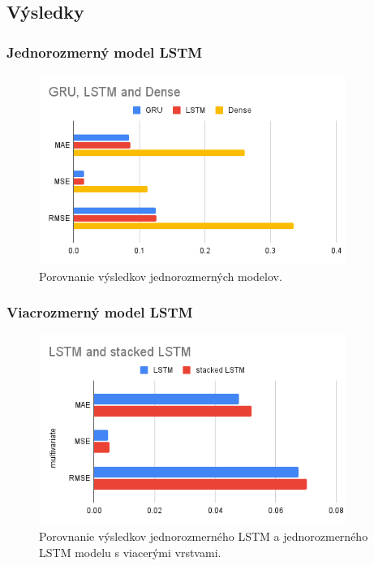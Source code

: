 \subsection{Výsledky}


\subsubsection{Jednorozmerný model LSTM}
\begin{figure}[!htbp]
  \centering
  \includegraphics[width=10cm]{img/GRU, LSTM and Dense.png}
  \caption{Porovnanie výsledkov jednorozmerných modelov.}
  \label{univariate}
\end{figure}


\subsubsection{Viacrozmerný model LSTM}
\begin{figure}[!htbp]
  \centering
  \includegraphics[width=10cm]{img/LSTM and stacked LSTM.png}
  \caption{Porovnanie výsledkov jednorozmerného LSTM a jednorozmerného LSTM modelu s viacerými vrstvami.}
  \label{stackedlstm}
\end{figure}

